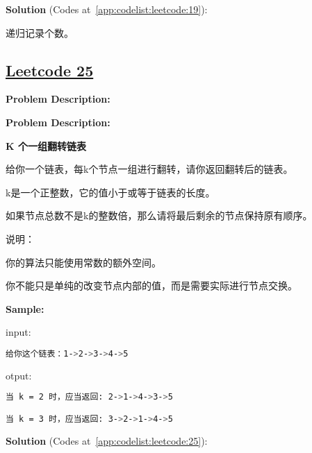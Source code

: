 \textbf{Solution }(Codes at~\ref{app:codelist:leetcode:19}):\par

递归记录个数。\par



\subsection{\href{https://leetcode-cn.com/}{Leetcode 25}}\label{app:problemlist:leetcode:25}

\textbf{Problem Description:}\par

\textbf{Problem Description:}\par

\textbf{K 个一组翻转链表}\par

给你一个链表，每k个节点一组进行翻转，请你返回翻转后的链表。\par

k是一个正整数，它的值小于或等于链表的长度。\par

如果节点总数不是k的整数倍，那么请将最后剩余的节点保持原有顺序。\par

说明：\par

你的算法只能使用常数的额外空间。\par

你不能只是单纯的改变节点内部的值，而是需要实际进行节点交换。\par


\textbf{Sample:}\par

input:\par

\begin{lstlisting}[language=bash]
给你这个链表：1->2->3->4->5
\end{lstlisting}

otput:\par

\begin{lstlisting}[language=bash]
当 k = 2 时，应当返回: 2->1->4->3->5

当 k = 3 时，应当返回: 3->2->1->4->5
\end{lstlisting}

\textbf{Solution }(Codes at~\ref{app:codelist:leetcode:25}):\par

